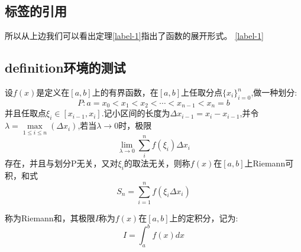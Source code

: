 \documentclass[cn, math=cm]{elegantbook}
\begin{document}
	\subsection{标签的引用}
	所以从上边我们可以看出定理\ref{label-1}指出了函数的展开形式。
	\ref{label-1}
	\newpage
	\subsection{definition环境的测试}

	\begin{definition}
	     设$f(x)$是定义在$[a,b]$上的有界函数，在$[a, b]$上任取分点$\{x_i\}^n_{i=0}$,做一种划分:\\
        $$P:a=x_0<x_1<x_2<\cdots<x_{n-1}<x_n=b$$
        并且任取点$\xi_i\in[x_{i-1},x_i]$.记小区间的长度为$\Delta x_{i-1}=x_i-x_{i-1}$,并令$\lambda=\max\limits_{1\le i\le n}(\Delta x_i)$,若当$\lambda\to 0$时，极限
        \begin{equation}
            \lim\limits_{\lambda\to 0}{\sum_{i}^{n}{f(\xi_i)\Delta x_i}}\nonumber
        \end{equation}
        存在，并且与划分P无关，又对$\xi_i$的取法无关，则称$f(x)$在$[a, b]$上Riemann可积，和式
        \begin{equation}
        S_n= \sum_{i=1}^{n}{f(\xi_i\Delta x_i)}\nonumber
        \end{equation}

        称为Riemann和，其极限$I$称为$f(x)$在$[a, b]$上的定积分，记为:
        \begin{equation}
        I=\int_{a}^{b}{f(x) dx}\nonumber
        \end{equation}
	\end{definition}
\end{document}
